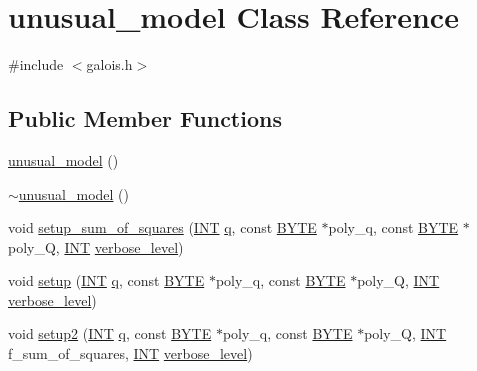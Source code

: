 \hypertarget{classunusual__model}{}\section{unusual\+\_\+model Class Reference}
\label{classunusual__model}


{\ttfamily \#include $<$galois.\+h$>$}

\subsection*{Public Member Functions}
\begin{DoxyCompactItemize}
\item 
\mbox{\hyperlink{classunusual__model_ad622323db037c81fd1843f9e365f3ab6}{unusual\+\_\+model}} ()
\item 
\mbox{\hyperlink{classunusual__model_a89c6d32fec241c3e88ba08ded5df4828}{$\sim$unusual\+\_\+model}} ()
\item 
void \mbox{\hyperlink{classunusual__model_ab330b51451b34a5291ee5707ef725eff}{setup\+\_\+sum\+\_\+of\+\_\+squares}} (\mbox{\hyperlink{galois_8h_a09fddde158a3a20bd2dcadb609de11dc}{I\+NT}} \mbox{\hyperlink{classunusual__model_af800c771403b11e428bc8f7e6f1e5149}{q}}, const \mbox{\hyperlink{galois_8h_ab6cc7b4aeb6ea31aba2b3fbfc83ff5e6}{B\+Y\+TE}} $\ast$poly\+\_\+q, const \mbox{\hyperlink{galois_8h_ab6cc7b4aeb6ea31aba2b3fbfc83ff5e6}{B\+Y\+TE}} $\ast$poly\+\_\+Q, \mbox{\hyperlink{galois_8h_a09fddde158a3a20bd2dcadb609de11dc}{I\+NT}} \mbox{\hyperlink{simeon_8_c_a818073fbcc2f439e7c56952f67386122}{verbose\+\_\+level}})
\item 
void \mbox{\hyperlink{classunusual__model_adb517fd342dd2ed2d0cc117211ac1c0d}{setup}} (\mbox{\hyperlink{galois_8h_a09fddde158a3a20bd2dcadb609de11dc}{I\+NT}} \mbox{\hyperlink{classunusual__model_af800c771403b11e428bc8f7e6f1e5149}{q}}, const \mbox{\hyperlink{galois_8h_ab6cc7b4aeb6ea31aba2b3fbfc83ff5e6}{B\+Y\+TE}} $\ast$poly\+\_\+q, const \mbox{\hyperlink{galois_8h_ab6cc7b4aeb6ea31aba2b3fbfc83ff5e6}{B\+Y\+TE}} $\ast$poly\+\_\+Q, \mbox{\hyperlink{galois_8h_a09fddde158a3a20bd2dcadb609de11dc}{I\+NT}} \mbox{\hyperlink{simeon_8_c_a818073fbcc2f439e7c56952f67386122}{verbose\+\_\+level}})
\item 
void \mbox{\hyperlink{classunusual__model_a00f7da705c24f863338828447abf7aae}{setup2}} (\mbox{\hyperlink{galois_8h_a09fddde158a3a20bd2dcadb609de11dc}{I\+NT}} \mbox{\hyperlink{classunusual__model_af800c771403b11e428bc8f7e6f1e5149}{q}}, const \mbox{\hyperlink{galois_8h_ab6cc7b4aeb6ea31aba2b3fbfc83ff5e6}{B\+Y\+TE}} $\ast$poly\+\_\+q, const \mbox{\hyperlink{galois_8h_ab6cc7b4aeb6ea31aba2b3fbfc83ff5e6}{B\+Y\+TE}} $\ast$poly\+\_\+Q, \mbox{\hyperlink{galois_8h_a09fddde158a3a20bd2dcadb609de11dc}{I\+NT}} f\+\_\+sum\+\_\+of\+\_\+squares, \mbox{\hyperlink{galois_8h_a09fddde158a3a20bd2dcadb609de11dc}{I\+NT}} \mbox{\hyperlink{simeon_8_c_a818073fbcc2f439e7c56952f67386122}{verbose\+\_\+level}})

\end{DoxyCompactItemize}
